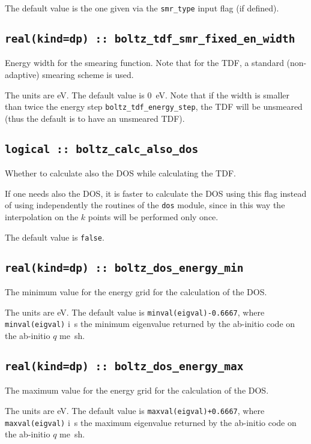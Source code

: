 The default value is the one given via the {\tt smr\_type} input flag (if defined).

\subsection[boltz\_tdf\_smr\_fixed\_en\_width]{\tt real(kind=dp) :: boltz\_tdf\_smr\_fixed\_en\_width}
Energy width for the smearing function. Note that for the TDF, a standard (non-adaptive) smearing scheme is used.

The units are eV.
The default value is 0~eV. Note that if the width is smaller than twice the energy step {\tt boltz\_tdf\_energy\_step}, the TDF will be unsmeared (thus the default is to have an unsmeared TDF).

\subsection[boltz\_calc\_also\_dos]{\tt logical :: boltz\_calc\_also\_dos}
Whether to calculate also the DOS while calculating the TDF.

If one needs also the DOS, it is faster to calculate the DOS using
this flag instead of using independently the routines of the {\tt dos} module, since in this way the interpolation on the $k$ points will be performed only once.

The default value is \verb#false#.

\subsection[boltz\_dos\_energy\_min]{\tt real(kind=dp) :: boltz\_dos\_energy\_min}
The minimum value for the energy grid for the calculation of the DOS.

The units are eV.
The default value is {\tt minval(eigval)-0.6667}, where  {\tt minval(eigval)} i\
s the minimum eigenvalue returned by the ab-initio code on the ab-initio $q$ me\
sh.

\subsection[boltz\_dos\_energy\_max]{\tt real(kind=dp) :: boltz\_dos\_energy\_max}
The maximum value for the energy grid for the calculation of the DOS.

The units are eV.
The default value is {\tt maxval(eigval)+0.6667}, where  {\tt maxval(eigval)} i\
s the maximum eigenvalue returned by the ab-initio code on the ab-initio $q$ me\
sh.

